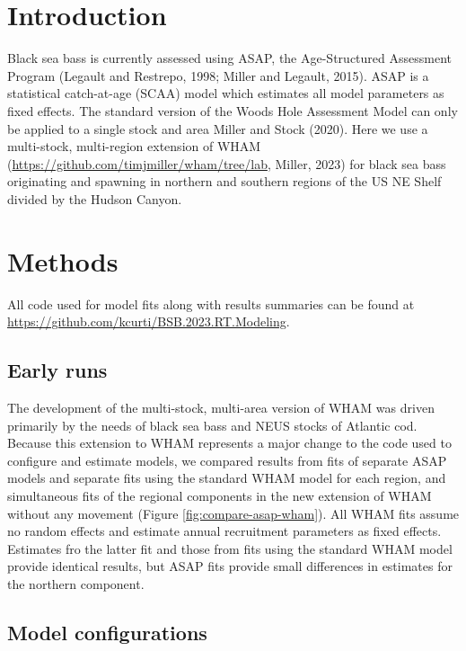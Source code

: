 \documentclass[
]{article}
\begin{document}
\pagebreak

\hypertarget{introduction}{%
\section{Introduction}\label{introduction}}

Black sea bass is currently assessed using ASAP, the Age-Structured Assessment Program (Legault and Restrepo, 1998; Miller and Legault, 2015). ASAP is a statistical catch-at-age (SCAA) model which estimates all model parameters as fixed effects. The standard version of the Woods Hole Assessment Model can only be applied to a single stock and area Miller and Stock (2020). Here we use a multi-stock, multi-region extension of WHAM (\url{https://github.com/timjmiller/wham/tree/lab}, Miller, 2023) for black sea bass originating and spawning in northern and southern regions of the US NE Shelf divided by the Hudson Canyon.

\hypertarget{methods}{%
\section{Methods}\label{methods}}

All code used for model fits along with results summaries can be found at \url{https://github.com/kcurti/BSB.2023.RT.Modeling}.

\hypertarget{early-runs}{%
\subsection{Early runs}\label{early-runs}}

The development of the multi-stock, multi-area version of WHAM was driven primarily by the needs of black sea bass and NEUS stocks of Atlantic cod. Because this extension to WHAM represents a major change to the code used to configure and estimate models, we compared results from fits of separate ASAP models and separate fits using the standard WHAM model for each region, and simultaneous fits of the regional components in the new extension of WHAM without any movement (Figure \ref{fig:compare-asap-wham}). All WHAM fits assume no random effects and estimate annual recruitment parameters as fixed effects. Estimates fro the latter fit and those from fits using the standard WHAM model provide identical results, but ASAP fits provide small differences in estimates for the northern component.

\hypertarget{model-configurations}{%
\subsection{Model configurations}\label{model-configurations}}
\end{document}
